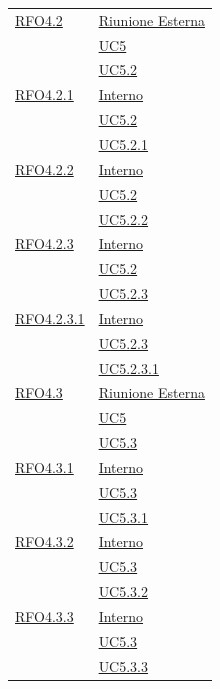 \begin{longtable}{|>{\centering}m{5cm}|m{5cm}<{\centering}|}
\hyperlink{RFO4.2}{RFO4.2} & \hyperlink{Riunione Esterna}{Riunione Esterna}\\
& \hyperref[UC5]{UC5}\\
& \hyperref[UC5.2]{UC5.2}\\ \hline

\hyperlink{RFO4.2.1}{RFO4.2.1} & \hyperlink{Interno}{Interno}\\
& \hyperref[UC5.2]{UC5.2}\\
& \hyperref[UC5.2.1]{UC5.2.1}\\ \hline

\hyperlink{RFO4.2.2}{RFO4.2.2} & \hyperlink{Interno}{Interno}\\
& \hyperref[UC5.2]{UC5.2}\\
& \hyperref[UC5.2.2]{UC5.2.2}\\ \hline

\hyperlink{RFO4.2.3}{RFO4.2.3} & \hyperlink{Interno}{Interno}\\
& \hyperref[UC5.2]{UC5.2}\\
& \hyperref[UC5.2.3]{UC5.2.3}\\ \hline

\hyperlink{RFO4.2.3.1}{RFO4.2.3.1} & \hyperlink{Interno}{Interno}\\
& \hyperref[UC5.2.3]{UC5.2.3}\\
& \hyperref[UC5.2.3.1]{UC5.2.3.1}\\ \hline

\hyperlink{RFO4.3}{RFO4.3} & \hyperlink{Riunione Esterna}{Riunione Esterna}\\
& \hyperref[UC5]{UC5}\\
& \hyperref[UC5.3]{UC5.3}\\ \hline

\hyperlink{RFO4.3.1}{RFO4.3.1} & \hyperlink{Interno}{Interno}\\
& \hyperref[UC5.3]{UC5.3}\\
& \hyperref[UC5.3.1]{UC5.3.1}\\ \hline

\hyperlink{RFO4.3.2}{RFO4.3.2} & \hyperlink{Interno}{Interno}\\
& \hyperref[UC5.3]{UC5.3}\\
& \hyperref[UC5.3.2]{UC5.3.2}\\ \hline

\hyperlink{RFO4.3.3}{RFO4.3.3} & \hyperlink{Interno}{Interno}\\
& \hyperref[UC5.3]{UC5.3}\\
& \hyperref[UC5.3.3]{UC5.3.3}\\ \hline


\end{longtable}
